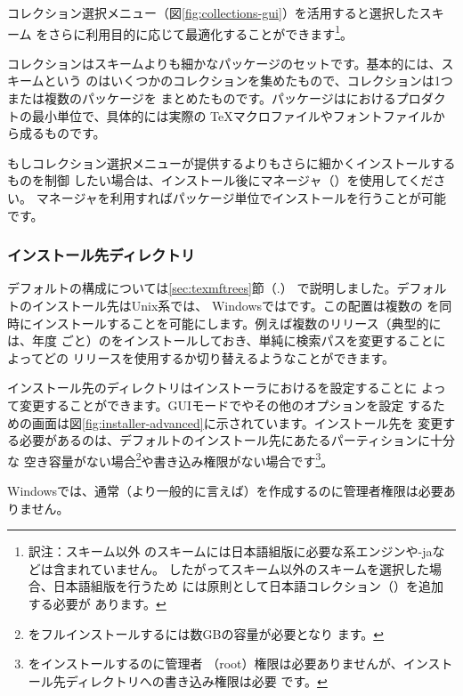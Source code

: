 \documentclass[uplatex,dvipdfmx,12pt]{jsarticle}
\begin{document}
コレクション選択メニュー（図\ref{fig:collections-gui}）を活用すると選択したスキーム
をさらに利用目的に応じて最適化することができます\footnote{訳注：スキーム以外
のスキームには日本語組版に必要な\pTeX 系エンジンや\LuaTeX-jaなどは含まれていません。
したがってスキーム以外のスキームを選択した場合、日本語組版を行うため
には原則として日本語コレクション（）を追加する必要が
あります。}。

コレクションはスキームよりも細かなパッケージのセットです。基本的には、スキームという
のはいくつかのコレクションを集めたもので、コレクションは1つまたは複数のパッケージを
まとめたものです。パッケージは\TL におけるプロダクトの最小単位で、具体的には実際の
\TeX マクロファイルやフォントファイルから成るものです。

もしコレクション選択メニューが提供するよりもさらに細かくインストールするものを制御
したい場合は、インストール後に\TL マネージャ（）を使用してください。
\TL マネージャを利用すればパッケージ単位でインストールを行うことが可能です。

\subsubsection{インストール先ディレクトリ}
\label{sec:directories}

デフォルトの\TL 構成については\ref{sec:texmftrees}節（\p.\pageref{sec:texmftrees}）
で説明しました。デフォルトのインストール先はUnix系では、
Windowsではです。この配置は複数の\TL
を同時にインストールすることを可能にします。例えば複数のリリース（典型的には、年度
ごと）の\TL をインストールしておき、単純に検索パスを変更することによってどの
リリースを使用するか切り替えるようなことができます。

インストール先のディレクトリはインストーラにおけるを設定することに
よって変更することができます。GUIモードでやその他のオプションを設定
するための画面は図\ref{fig:installer-advanced}に示されています。インストール先を
変更する必要があるのは、デフォルトのインストール先にあたるパーティションに十分な
空き容量がない場合\footnote{\TL をフルインストールするには数GBの容量が必要となり
ます。}や書き込み権限がない場合です\footnote{\TL をインストールするのに管理者
（root）権限は必要ありませんが、インストール先ディレクトリへの書き込み権限は必要
です。}。

Windowsでは、通常（より一般的に言えば）を作成するのに管理者権限は必要ありません。
\end{document}
